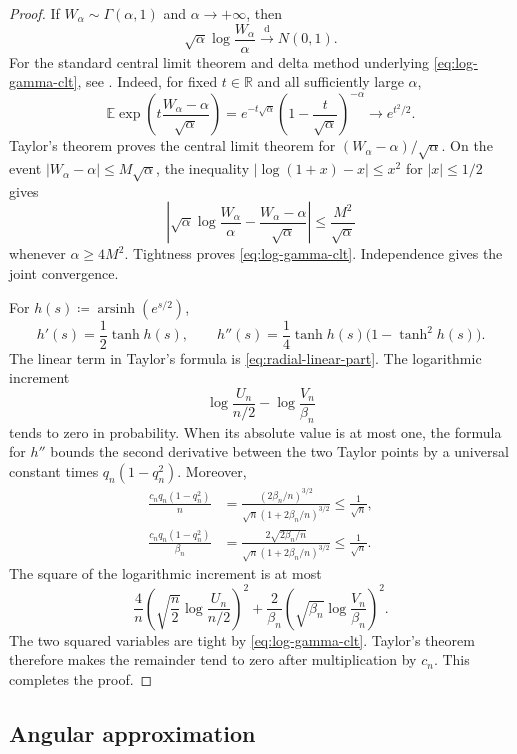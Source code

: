 \documentclass{amsart}
\numberwithin{equation}{section}
\theoremstyle{plain}
\theoremstyle{definition}
\theoremstyle{remark}
\newcommand{\R}{\mathbb R}
\DeclareMathOperator{\arsinh}{arsinh}
\begin{document}
\begin{proof}
If $W_\alpha\sim\Gamma(\alpha,1)$ and $\alpha\to+\infty$, then
\begin{equation}\label{eq:log-gamma-clt} \sqrt\alpha\log\frac{W_\alpha}{\alpha} \overset{\mathrm{d}}{\longrightarrow} N(0,1). \end{equation}
For the standard central limit theorem and delta method underlying
\eqref{eq:log-gamma-clt}, see \cite{billingsley1995probability}.
Indeed, for fixed $t\in\R$ and all sufficiently large $\alpha$,
\[ \mathbb E\exp\left(t\frac{W_\alpha-\alpha}{\sqrt\alpha}\right) =e^{-t\sqrt\alpha}\left(1-\frac{t}{\sqrt\alpha}\right)^{-\alpha} \longrightarrow e^{t^2/2}. \]
Taylor's theorem proves the central limit theorem for $(W_\alpha-\alpha)/\sqrt\alpha$.  On the event $|W_\alpha-\alpha|\le M\sqrt\alpha$, the inequality $|\log(1+x)-x|\le x^2$ for $|x|\le1/2$ gives
\[ \left|\sqrt\alpha\log\frac{W_\alpha}{\alpha} -\frac{W_\alpha-\alpha}{\sqrt\alpha}\right| \le\frac{M^2}{\sqrt\alpha} \]
whenever $\alpha\ge4M^2$.  Tightness proves \eqref{eq:log-gamma-clt}.  Independence gives the joint convergence.

For $h(s)\coloneqq\arsinh(e^{s/2})$,
\[ h'(s)=\frac12\tanh h(s), \qquad h''(s)=\frac14\tanh h(s)\bigl(1-\tanh^2h(s)\bigr). \]
The linear term in Taylor's formula is \eqref{eq:radial-linear-part}.  The logarithmic increment
\[ \log\frac{U_n}{n/2}-\log\frac{V_n}{\beta_n} \]
tends to zero in probability.  When its absolute value is at most one, the formula for $h''$ bounds the second derivative between the two Taylor points by a universal constant times $q_n(1-q_n^2)$.  Moreover,
\begin{align*}
 \frac{c_nq_n(1-q_n^2)}{n}
 &=\frac{(2\beta_n/n)^{3/2}}
 {\sqrt n(1+2\beta_n/n)^{3/2}}
 \le\frac1{\sqrt n},\\
 \frac{c_nq_n(1-q_n^2)}{\beta_n}
 &=\frac{2\sqrt{2\beta_n/n}}
 {\sqrt n(1+2\beta_n/n)^{3/2}}
 \le\frac1{\sqrt n}.
\end{align*}
The square of the logarithmic increment is at most
\[ \frac4n\left(\sqrt{\frac n2}\log\frac{U_n}{n/2}\right)^2 +\frac2{\beta_n} \left(\sqrt{\beta_n}\log\frac{V_n}{\beta_n}\right)^2. \]
The two squared variables are tight by \eqref{eq:log-gamma-clt}.  Taylor's theorem therefore makes the remainder tend to zero after multiplication by $c_n$.  This completes the proof.
\end{proof}

\subsection{Angular approximation}
\end{document}

